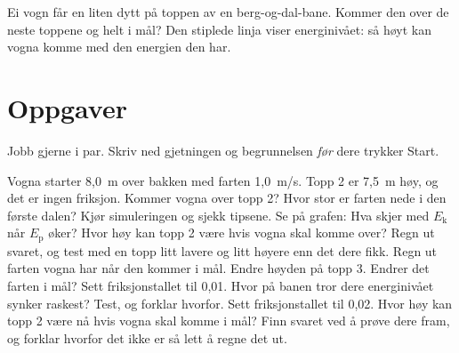 \documentclass[11pt]{article}
\begin{document}

Ei vogn får en liten dytt på toppen av en berg-og-dal-bane. Kommer den over de neste toppene og helt i mål? Den stiplede linja viser energinivået: så høyt kan vogna komme med den energien den har.

\section*{Oppgaver}

Jobb gjerne i par. Skriv ned gjetningen og begrunnelsen \emph{før} dere trykker Start.

\begin{oppgaveliste}
\oppgave {}Vogna starter 8,0~m over bakken med farten 1,0~m/s. Topp 2 er 7,5~m høy, og det er ingen friksjon. Kommer vogna over topp 2? Hvor stor er farten nede i den første dalen?
\svar
\oppgave {}Kjør simuleringen og sjekk tipsene. Se på grafen: Hva skjer med $E_{\mathrm{k}}$ når $E_{\mathrm{p}}$ øker?
\svar
\oppgave {}Hvor høy kan topp 2 være hvis vogna skal komme over? Regn ut svaret, og test med en topp litt lavere og litt høyere enn det dere fikk.
\svar
\oppgave {}Regn ut farten vogna har når den kommer i mål. Endre høyden på topp 3. Endrer det farten i mål?
\svar
\oppgave {}Sett friksjonstallet til 0,01. Hvor på banen tror dere energinivået synker raskest? Test, og forklar hvorfor.
\svar
\oppgave {}Sett friksjonstallet til 0,02. Hvor høy kan topp 2 være nå hvis vogna skal komme i mål? Finn svaret ved å prøve dere fram, og forklar hvorfor det ikke er så lett å regne det ut.
\svar
\end{oppgaveliste}
\end{document}

